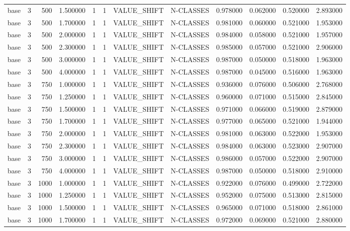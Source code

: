 \begin{tabular}{lrrrllllrrrr}
base & 3 & 500 & 1.500000 & 1 & 1 & VALUE_SHIFT & N-CLASSES & 0.978000 & 0.062000 & 0.520000 & 2.893000 \\
base & 3 & 500 & 1.700000 & 1 & 1 & VALUE_SHIFT & N-CLASSES & 0.981000 & 0.060000 & 0.521000 & 1.953000 \\
base & 3 & 500 & 2.000000 & 1 & 1 & VALUE_SHIFT & N-CLASSES & 0.984000 & 0.058000 & 0.521000 & 1.957000 \\
base & 3 & 500 & 2.300000 & 1 & 1 & VALUE_SHIFT & N-CLASSES & 0.985000 & 0.057000 & 0.521000 & 2.906000 \\
base & 3 & 500 & 3.000000 & 1 & 1 & VALUE_SHIFT & N-CLASSES & 0.987000 & 0.050000 & 0.518000 & 1.963000 \\
base & 3 & 500 & 4.000000 & 1 & 1 & VALUE_SHIFT & N-CLASSES & 0.987000 & 0.045000 & 0.516000 & 1.963000 \\
base & 3 & 750 & 1.000000 & 1 & 1 & VALUE_SHIFT & N-CLASSES & 0.936000 & 0.076000 & 0.506000 & 2.768000 \\
base & 3 & 750 & 1.250000 & 1 & 1 & VALUE_SHIFT & N-CLASSES & 0.960000 & 0.071000 & 0.515000 & 2.845000 \\
base & 3 & 750 & 1.500000 & 1 & 1 & VALUE_SHIFT & N-CLASSES & 0.971000 & 0.066000 & 0.519000 & 2.879000 \\
base & 3 & 750 & 1.700000 & 1 & 1 & VALUE_SHIFT & N-CLASSES & 0.977000 & 0.065000 & 0.521000 & 1.944000 \\
base & 3 & 750 & 2.000000 & 1 & 1 & VALUE_SHIFT & N-CLASSES & 0.981000 & 0.063000 & 0.522000 & 1.953000 \\
base & 3 & 750 & 2.300000 & 1 & 1 & VALUE_SHIFT & N-CLASSES & 0.984000 & 0.063000 & 0.523000 & 2.907000 \\
base & 3 & 750 & 3.000000 & 1 & 1 & VALUE_SHIFT & N-CLASSES & 0.986000 & 0.057000 & 0.522000 & 2.907000 \\
base & 3 & 750 & 4.000000 & 1 & 1 & VALUE_SHIFT & N-CLASSES & 0.987000 & 0.050000 & 0.518000 & 2.910000 \\
base & 3 & 1000 & 1.000000 & 1 & 1 & VALUE_SHIFT & N-CLASSES & 0.922000 & 0.076000 & 0.499000 & 2.722000 \\
base & 3 & 1000 & 1.250000 & 1 & 1 & VALUE_SHIFT & N-CLASSES & 0.952000 & 0.075000 & 0.513000 & 2.815000 \\
base & 3 & 1000 & 1.500000 & 1 & 1 & VALUE_SHIFT & N-CLASSES & 0.965000 & 0.071000 & 0.518000 & 2.861000 \\
base & 3 & 1000 & 1.700000 & 1 & 1 & VALUE_SHIFT & N-CLASSES & 0.972000 & 0.069000 & 0.521000 & 2.880000 \\

\end{tabular}
